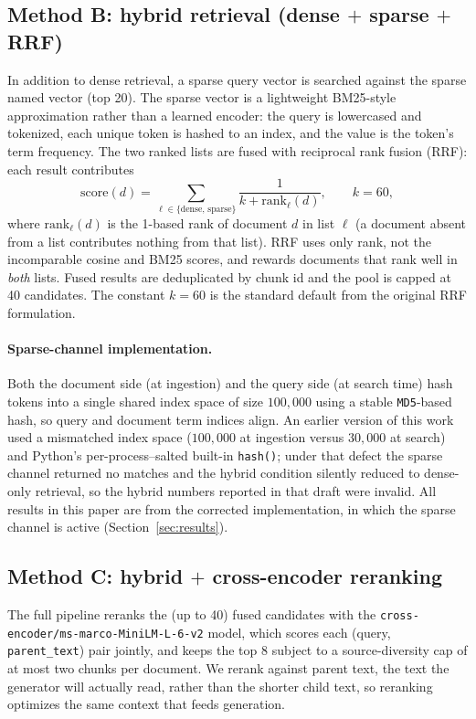 \documentclass[conference]{IEEEtran}
\begin{document}
\subsection{Method B: hybrid retrieval (dense $+$ sparse $+$ RRF)}
In addition to dense retrieval, a sparse query vector is searched against the
sparse named vector (top 20). The sparse vector is a lightweight BM25-style
approximation rather than a learned encoder: the query is lowercased and
tokenized, each unique token is hashed to an index, and the value is the token's
term frequency. The two ranked lists are fused with reciprocal rank fusion (RRF):
each result contributes
\begin{equation}
\text{score}(d) = \sum_{\ell \in \{\text{dense},\,\text{sparse}\}}
\frac{1}{k + \text{rank}_{\ell}(d)},
\qquad k = 60,
\label{eq:rrf}
\end{equation}
where $\text{rank}_{\ell}(d)$ is the 1-based rank of document $d$ in list $\ell$
(a document absent from a list contributes nothing from that list). RRF uses only
rank, not the incomparable cosine and BM25 scores, and rewards documents that
rank well in \emph{both} lists. Fused results are deduplicated by chunk id and
the pool is capped at 40 candidates. The constant $k=60$ is the standard default
from the original RRF formulation.

\paragraph*{Sparse-channel implementation.} Both the document side (at
ingestion) and the query side (at search time) hash tokens into a single shared
index space of size $100{,}000$ using a stable \texttt{MD5}-based hash, so query
and document term indices align. An earlier version of this work used a
mismatched index space ($100{,}000$ at ingestion versus $30{,}000$ at search) and
Python's per-process--salted built-in \texttt{hash()}; under that defect the
sparse channel returned no matches and the hybrid condition silently reduced to
dense-only retrieval, so the hybrid numbers reported in that draft were invalid.
All results in this paper are from the corrected implementation, in which the
sparse channel is active (Section~\ref{sec:results}).

\subsection{Method C: hybrid $+$ cross-encoder reranking}
The full pipeline reranks the (up to 40) fused candidates with the
\texttt{cross-encoder/ms-marco-MiniLM-L-6-v2} model, which scores each
(query, \texttt{parent\_text}) pair jointly, and keeps the top 8 subject to a
source-diversity cap of at most two chunks per document. We rerank
against parent text, the text the generator will actually read, rather than the
shorter child text, so reranking optimizes the same context that feeds
generation.
\end{document}
